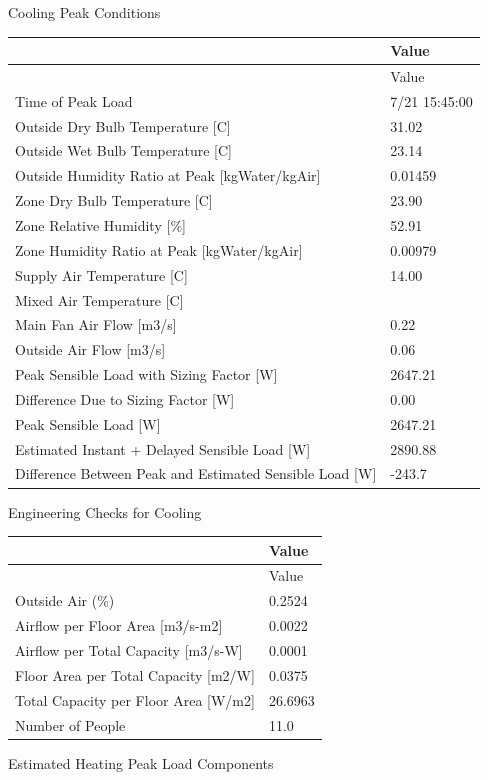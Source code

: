 Cooling Peak Conditions

{\scriptsize
\begin{longtable}[c]{@{}ll@{}}
\toprule
 & Value \tabularnewline
\midrule
\endfirsthead

\toprule
 & Value \tabularnewline
\midrule
\endhead

Time of Peak Load & 7/21 15:45:00 \tabularnewline
Outside Dry Bulb Temperature {[}C{]} & 31.02 \tabularnewline
Outside Wet Bulb Temperature {[}C{]} & 23.14 \tabularnewline
Outside Humidity Ratio at Peak {[}kgWater/kgAir{]} & 0.01459 \tabularnewline
Zone Dry Bulb Temperature {[}C{]} & 23.90 \tabularnewline
Zone Relative Humidity {[}\%{]} & 52.91 \tabularnewline
Zone Humidity Ratio at Peak {[}kgWater/kgAir{]} & 0.00979 \tabularnewline
Supply Air Temperature {[}C{]} & 14.00 \tabularnewline
Mixed Air Temperature {[}C{]} &  \tabularnewline
Main Fan Air Flow {[}m3/s{]} & 0.22 \tabularnewline
Outside Air Flow {[}m3/s{]} & 0.06 \tabularnewline
Peak Sensible Load with Sizing Factor {[}W{]} & 2647.21 \tabularnewline
Difference Due to Sizing Factor {[}W{]} & 0.00 \tabularnewline
Peak Sensible Load {[}W{]} & 2647.21 \tabularnewline
Estimated Instant + Delayed Sensible Load {[}W{]} & 2890.88 \tabularnewline
Difference Between Peak and Estimated Sensible Load {[}W{]} & -243.7 \tabularnewline
\bottomrule
\end{longtable}}

Engineering Checks for Cooling

{\scriptsize
\begin{longtable}[c]{@{}ll@{}}
\toprule
 & Value \tabularnewline
\midrule
\endfirsthead

\toprule
 & Value \tabularnewline
\midrule
\endhead


Outside Air (\%) & 0.2524 \tabularnewline
Airflow per Floor Area {[}m3/s-m2{]} & 0.0022 \tabularnewline
Airflow per Total Capacity {[}m3/s-W{]} & 0.0001 \tabularnewline
Floor Area per Total Capacity {[}m2/W{]} & 0.0375 \tabularnewline
Total Capacity per Floor Area {[}W/m2{]} & 26.6963 \tabularnewline
Number of People & 11.0 \tabularnewline

\bottomrule
\end{longtable}}


Estimated Heating Peak Load Components


